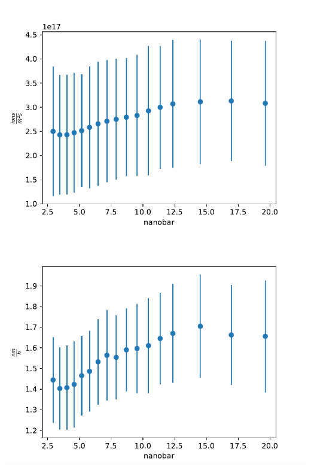 \documentclass{beamer} %
\begin{document}
\begin{frame}
\begin{minipage}{0.49\textwidth}
        \includegraphics[width=1.1\textwidth]{figures/Gasvary_H2_2A_flux_werrors.pdf}
    \end{minipage}
    \begin{minipage}{0.49\textwidth}
        \includegraphics[width=1.1\textwidth]{figures/Gasvary_H2_2A_worstcasesput_werrors.pdf}
    \end{minipage}
\end{frame}
\end{document}
